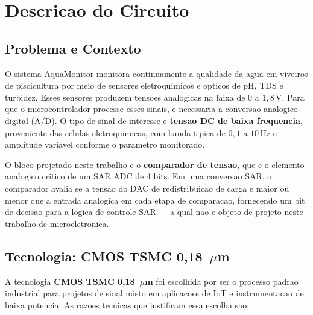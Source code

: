 \documentclass[12pt, a4paper]{article}
\begin{document}
\section{Descricao do Circuito}
\label{sec:descricao}

\subsection{Problema e Contexto}

O sistema AquaMonitor monitora continuamente a qualidade da agua em viveiros de
piscicultura por meio de sensores eletroquimicos e opticos de pH, TDS e turbidez.
Esses sensores produzem tensoes analogicas na faixa de $0$ a $1{,}8\,\text{V}$.
Para que o microcontrolador processe esses sinais, e necessaria a conversao
analogico-digital (A/D). O tipo de sinal de interesse e \textbf{tensao DC de baixa
frequencia}, proveniente das celulas eletroquimicas, com banda tipica de $0{,}1$ a
$10\,\text{Hz}$ e amplitude variavel conforme o parametro monitorado.

O bloco projetado neste trabalho e o \textbf{comparador de tensao}, que e o elemento
analogico critico de um SAR ADC de 4 bits. Em uma conversao SAR, o comparador avalia
se a tensao do DAC de redistribuicao de carga e maior ou menor que a entrada analogica
em cada etapa de comparacao, fornecendo um bit de decisao para a logica de controle
SAR --- a qual nao e objeto de projeto neste trabalho de microeletronica.

\subsection{Tecnologia: CMOS TSMC \texorpdfstring{0{,}18~$\mu$m}{0,18 um}}

A tecnologia \textbf{CMOS TSMC 0{,}18~$\mu$m} foi escolhida por ser o processo
padrao industrial para projetos de sinal misto em aplicacoes de IoT e instrumentacao
de baixa potencia. As razoes tecnicas que justificam essa escolha sao:
\end{document}
